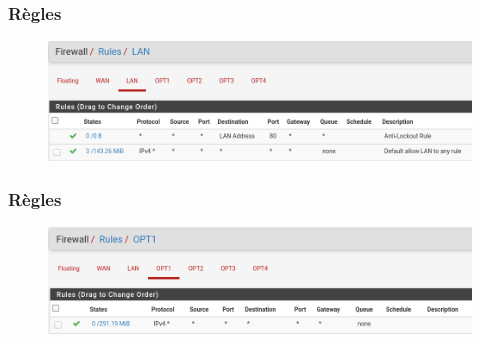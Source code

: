 \documentclass{beamer}
\begin{document}
		\begin{frame}
			\frametitle{Règles}
			\begin{center}
				\begin{figure}
					\includegraphics[scale=.3]{rules2.png}
					\caption{}
				\end{figure}
			\end{center}
		\end{frame}
		\begin{frame}
			\frametitle{Règles}
			\begin{center}
				\begin{figure}
					\includegraphics[scale=.3]{rules3.png}
					\caption{}
				\end{figure}
			\end{center}
		\end{frame}
\end{document}

